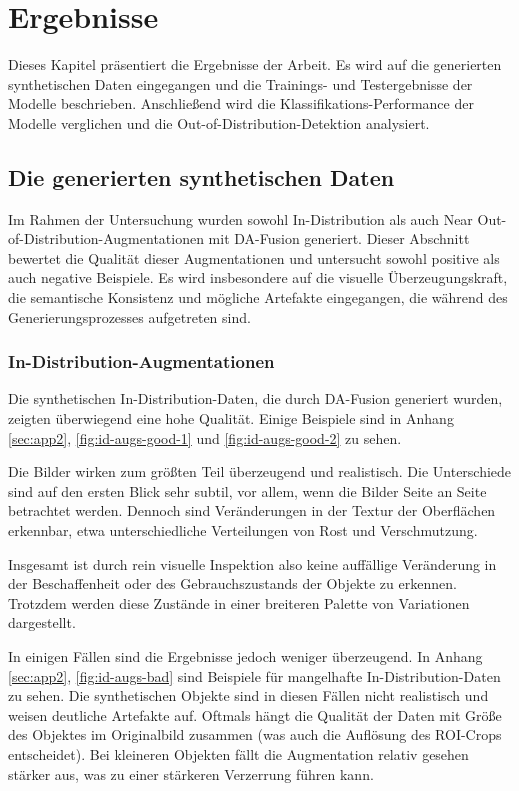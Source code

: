 \chapter{Ergebnisse} \label{ch:results}

Dieses Kapitel präsentiert die Ergebnisse der Arbeit. Es wird auf die generierten synthetischen Daten eingegangen und die Trainings- und Testergebnisse der Modelle beschrieben. Anschließend wird die Klassifikations-Performance der Modelle verglichen und die Out-of-Distribution-Detektion analysiert.

\section{Die generierten synthetischen Daten} \label{sec:da-fusion-results}

Im Rahmen der Untersuchung wurden sowohl In-Distribution als auch Near Out-of-Distribution-Augmentationen mit DA-Fusion generiert. Dieser Abschnitt bewertet die Qualität dieser Augmentationen und untersucht sowohl positive als auch negative Beispiele. Es wird insbesondere auf die visuelle Überzeugungskraft, die semantische Konsistenz und mögliche Artefakte eingegangen, die während des Generierungsprozesses aufgetreten sind.

\subsection{In-Distribution-Augmentationen} \label{subsec:da-fusion-id-results}

Die synthetischen In-Distribution-Daten, die durch DA-Fusion generiert wurden, zeigten überwiegend eine hohe Qualität. Einige Beispiele sind in Anhang \ref{sec:app2}, \autoref{fig:id-augs-good-1} und \ref{fig:id-augs-good-2} zu sehen.

Die Bilder wirken zum größten Teil überzeugend und realistisch. Die Unterschiede sind auf den ersten Blick sehr subtil, vor allem, wenn die Bilder Seite an Seite betrachtet werden. Dennoch sind Veränderungen in der Textur der Oberflächen erkennbar, etwa unterschiedliche Verteilungen von Rost und Verschmutzung.

Insgesamt ist durch rein visuelle Inspektion also keine auffällige Veränderung in der Beschaffenheit oder des Gebrauchszustands der Objekte zu erkennen. Trotzdem werden diese Zustände in einer breiteren Palette von Variationen dargestellt.

In einigen Fällen sind die Ergebnisse jedoch weniger überzeugend. In Anhang \ref{sec:app2}, \autoref{fig:id-augs-bad} sind Beispiele für mangelhafte In-Distribution-Daten zu sehen. Die synthetischen Objekte sind in diesen Fällen nicht realistisch und weisen deutliche Artefakte auf. Oftmals hängt die Qualität der Daten mit Größe des Objektes im Originalbild zusammen (was auch die Auflösung des ROI-Crops entscheidet). Bei kleineren Objekten fällt die Augmentation relativ gesehen stärker aus, was zu einer stärkeren Verzerrung führen kann.

